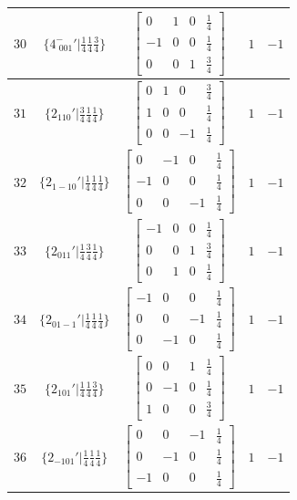 \documentclass[fleqn,8pt]{jsarticle}
\begin{document}
\begin{longtable}{ccccc}
$ 30 $ & $ \{4^{-}_{\,\,001}{}'|\frac{1}{4} \frac{1}{4} \frac{3}{4}\} $ & $ \begin{bmatrix} 0 & 1 & 0 & \frac{1}{4} \\ -1 & 0 & 0 & \frac{1}{4} \\ 0 & 0 & 1 & \frac{3}{4} \end{bmatrix} $ & $ 1 $ & $ -1 $ \\ \hline
$ 31 $ & $ \{2{}_{110}{}'|\frac{3}{4} \frac{1}{4} \frac{1}{4}\} $ & $ \begin{bmatrix} 0 & 1 & 0 & \frac{3}{4} \\ 1 & 0 & 0 & \frac{1}{4} \\ 0 & 0 & -1 & \frac{1}{4} \end{bmatrix} $ & $ 1 $ & $ -1 $ \\ \hline
$ 32 $ & $ \{2{}_{1-10}{}'|\frac{1}{4} \frac{1}{4} \frac{1}{4}\} $ & $ \begin{bmatrix} 0 & -1 & 0 & \frac{1}{4} \\ -1 & 0 & 0 & \frac{1}{4} \\ 0 & 0 & -1 & \frac{1}{4} \end{bmatrix} $ & $ 1 $ & $ -1 $ \\ \hline
$ 33 $ & $ \{2{}_{011}{}'|\frac{1}{4} \frac{3}{4} \frac{1}{4}\} $ & $ \begin{bmatrix} -1 & 0 & 0 & \frac{1}{4} \\ 0 & 0 & 1 & \frac{3}{4} \\ 0 & 1 & 0 & \frac{1}{4} \end{bmatrix} $ & $ 1 $ & $ -1 $ \\ \hline
$ 34 $ & $ \{2{}_{01-1}{}'|\frac{1}{4} \frac{1}{4} \frac{1}{4}\} $ & $ \begin{bmatrix} -1 & 0 & 0 & \frac{1}{4} \\ 0 & 0 & -1 & \frac{1}{4} \\ 0 & -1 & 0 & \frac{1}{4} \end{bmatrix} $ & $ 1 $ & $ -1 $ \\ \hline
$ 35 $ & $ \{2{}_{101}{}'|\frac{1}{4} \frac{1}{4} \frac{3}{4}\} $ & $ \begin{bmatrix} 0 & 0 & 1 & \frac{1}{4} \\ 0 & -1 & 0 & \frac{1}{4} \\ 1 & 0 & 0 & \frac{3}{4} \end{bmatrix} $ & $ 1 $ & $ -1 $ \\ \hline
$ 36 $ & $ \{2{}_{-101}{}'|\frac{1}{4} \frac{1}{4} \frac{1}{4}\} $ & $ \begin{bmatrix} 0 & 0 & -1 & \frac{1}{4} \\ 0 & -1 & 0 & \frac{1}{4} \\ -1 & 0 & 0 & \frac{1}{4} \end{bmatrix} $ & $ 1 $ & $ -1 $ \\ \hline

\end{longtable}
\end{document}
